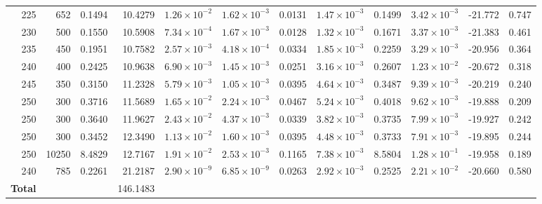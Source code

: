 \begin{landscape}
\begin{footnotesize}
\begin{longtable}{r r r r r r r r r r r r}
225 & 652 & 0.1494 & 10.4279 & \(1.26\!\times\!10^{-2}\) & \(1.62\!\times\!10^{-3}\) & 0.0131 & \(1.47\!\times\!10^{-3}\) & 0.1499 & \(3.42\!\times\!10^{-3}\) & -21.772 & 0.747 \\
230 & 500 & 0.1550 & 10.5908 & \(7.34\!\times\!10^{-4}\) & \(1.67\!\times\!10^{-3}\) & 0.0128 & \(1.32\!\times\!10^{-3}\) & 0.1671 & \(3.37\!\times\!10^{-3}\) & -21.383 & 0.461 \\
235 & 450 & 0.1951 & 10.7582 & \(2.57\!\times\!10^{-3}\) & \(4.18\!\times\!10^{-4}\) & 0.0334 & \(1.85\!\times\!10^{-3}\) & 0.2259 & \(3.29\!\times\!10^{-3}\) & -20.956 & 0.364 \\
240 & 400 & 0.2425 & 10.9638 & \(6.90\!\times\!10^{-3}\) & \(1.45\!\times\!10^{-3}\) & 0.0251 & \(3.16\!\times\!10^{-3}\) & 0.2607 & \(1.23\!\times\!10^{-2}\) & -20.672 & 0.318 \\
245 & 350 & 0.3150 & 11.2328 & \(5.79\!\times\!10^{-3}\) & \(1.05\!\times\!10^{-3}\) & 0.0395 & \(4.64\!\times\!10^{-3}\) & 0.3487 & \(9.39\!\times\!10^{-3}\) & -20.219 & 0.240 \\
250 & 300 & 0.3716 & 11.5689 & \(1.65\!\times\!10^{-2}\) & \(2.24\!\times\!10^{-3}\) & 0.0467 & \(5.24\!\times\!10^{-3}\) & 0.4018 & \(9.62\!\times\!10^{-3}\) & -19.888 & 0.209 \\
250 & 300 & 0.3640 & 11.9627 & \(2.43\!\times\!10^{-2}\) & \(4.37\!\times\!10^{-3}\) & 0.0339 & \(3.82\!\times\!10^{-3}\) & 0.3735 & \(7.99\!\times\!10^{-3}\) & -19.927 & 0.242 \\
250 & 300 & 0.3452 & 12.3490 & \(1.13\!\times\!10^{-2}\) & \(1.60\!\times\!10^{-3}\) & 0.0395 & \(4.48\!\times\!10^{-3}\) & 0.3733 & \(7.91\!\times\!10^{-3}\) & -19.895 & 0.244 \\
250 & 10250 & 8.4829 & 12.7167 & \(1.91\!\times\!10^{-2}\) & \(2.53\!\times\!10^{-3}\) & 0.1165 & \(7.38\!\times\!10^{-3}\) & 8.5804 & \(1.28\!\times\!10^{-1}\) & -19.958 & 0.189 \\
240 & 785 & 0.2261 & 21.2187 & \(2.90\!\times\!10^{-9}\) & \(6.85\!\times\!10^{-9}\) & 0.0263 & \(2.92\!\times\!10^{-3}\) & 0.2525 & \(2.21\!\times\!10^{-2}\) & -20.660 & 0.580 \\
\midrule
\textbf{Total} &  &  & 146.1483 &  &  &  &  &  &  &  &  \\
\end{longtable}
\end{footnotesize}
\end{landscape}
